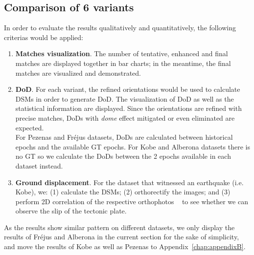 \subsection{Comparison of 6 variants}
In order to evaluate the results qualitatively and quantitatively, the following criterias would be applied:\\
\begin{enumerate}
	\item \textbf{Matches visualization}. The number of tentative, enhanced and final matches are displayed together in bar charts; in the meantime, the final matches are visualized and demonstrated.
	\item \textbf{\ac{DoD}}. For each variant, the refined orientations would be used to calculate \ac{DSM}s in order to generate \ac{DoD}. The visualization of \ac{DoD} as well as the statistical information are displayed. Since the orientations are refined with precise matches, \ac{DoD}s with \textit{dome} effect mitigated or even eliminated are expected.\\
	For Pezenas and Fr\'ejus datasets, DoDs are calculated between historical epochs and the available \ac{GT} epochs. For Kobe and Alberona datasets there is no \ac{GT} so we calculate the \ac{DoD}s between the 2 epochs available in each dataset instead.\\
	\item \textbf{Ground displacement}. For the dataset that witnessed an earthquake (i.e. Kobe), we: (1) calculate the \ac{DSM}s; (2) orthorectify the images; and (3) perform 2D correlation of the respective orthophotos ~\cite{rosu2015measurement} to see whether we can observe the slip of the tectonic plate.
\end{enumerate}

As the results show similar pattern on different datasets, we only display the results of Fr{\'e}jus and Alberona in the current section for the sake of simplicity, and move the results of Kobe as well as Pezenas to Appendix~\ref{chap:appendixB}.\\

